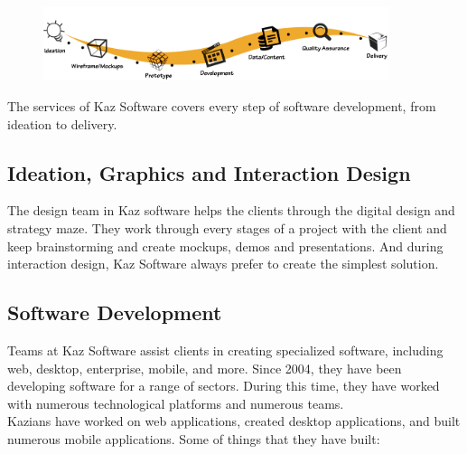 \begin{figure}[h]
    \begin{center}
        \includegraphics[width= 0.9\textwidth]{images/Chapter2/kaz_services.png}  
        \label{fig:kazServices}
    \end{center}
\end{figure}

The services of Kaz Software covers every step of software development, from ideation to delivery.

\subsection{Ideation, Graphics and Interaction Design}

The design team in Kaz software helps the clients through the digital design and strategy maze.
They work through every stages of a project with the client and keep brainstorming and create mockups, demos and presentations.
And during interaction design, Kaz Software always prefer to create the simplest solution.

\subsection{Software Development}

Teams at Kaz Software assist clients in creating specialized software, including web, desktop, enterprise, mobile, and more.
Since 2004, they have been developing software for a range of sectors.
During this time, they have worked with numerous technological platforms and numerous teams. \\

Kazians have worked on web applications, created desktop applications, and built numerous mobile applications. Some of things that they have built:

